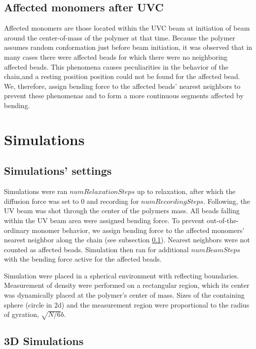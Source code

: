 \documentclass[12pt]{report}
\begin{document}
     \subsection{Affected monomers after UVC}\label{subsection_affectedMonomersAfterUVC}
      Affected monomers are those located within the UVC beam at initiation of beam around the center-of-mass of the polymer at that time. Because the polymer assumes random conformation just before beam initiation, it was observed that in many cases there were affected beads for which there were no neighboring affected beads. This phenomena causes peculiarities in the behavior of the chain,and a resting position position could not be found for the affected bead. We, therefore, assign bending force to the affected beads' nearest neighbors to prevent these phenomenas and to form a more continuous segments affected by bending. 
             		
	\section{Simulations}	
	
	\subsection{Simulations' settings}
	Simulations were ran $numRelaxationSteps$ up to relaxation, after which the diffusion force was set to $0$ and recording for $numRecordingSteps$. Following, the UV beam was shot through the center of the polymers mass. All beads falling within the UV beam area were assigned bending force. To prevent out-of-the-ordinary monomer behavior, we assign bending force to the affected monomers' nearest neighbor along the chain (see subsection \ref{subsection_affectedMonomersAfterUVC}). Nearest neighbors were not counted as affected beads. Simulation then ran for additional $numBeamSteps$ with the bending force active for the affected beads.
	
	Simulation were placed in a spherical environment with reflecting boundaries.
	Measurement of density were performed on a rectangular region, which its center was dynamically placed at the polymer's center of mass.
	Sizes of the containing sphere (circle in 2d) and the measurement region were proportional to the radius of gyration, $\sqrt{N/6}b$.
	
	\subsection{3D Simulations}
\end{document}
